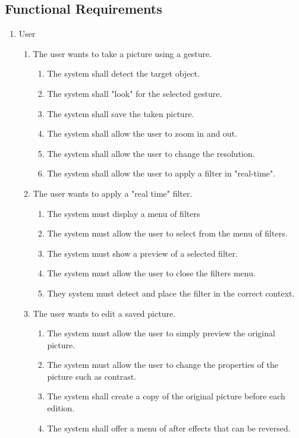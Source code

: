 \documentclass[12pt, titlepage]{article}
\begin{document}
\newpage
\subsection{Functional Requirements}
\begin{enumerate}[{VP}1.]
	\item User 
	\begin{enumerate}[{BE1}.1]
	    \item The user wants to take a picture using a gesture.
	    \begin{enumerate}
	        \item The system shall detect the target object. 
	        \item The system shall "look" for the selected gesture.
	        \item The system shall save the taken picture. 
	        \item The system shall allow the user to zoom in and out. 
	        \item The system shall allow the user to change the resolution.
	        \item The system shall allow the user to apply a filter in "real-time".
	    \end{enumerate}
	    
	    \item The user wants to apply a "real time" filter. 
	    \begin{enumerate}
	        \item The system must display a menu of filters
	        \item The system must allow the user to select from the menu of filters.
	        \item The system must show a preview of a selected filter.
	        \item The system must allow the user to close the filters menu.
	        \item They system must detect and place the filter in the correct context. 
	    \end{enumerate}
	    
	    \item The user wants to edit a saved picture.
	    \begin{enumerate}
            \item The system must allow the user to simply preview the original picture.
            \item The system must allow the user to change the properties of the picture such as contrast.
            \item The system shall create a copy of the original picture before each edition.
            \item The system shall offer a menu of after effects that can be reversed. 
	    \end{enumerate}
	\end{enumerate}
\end{enumerate}
\end{document}
